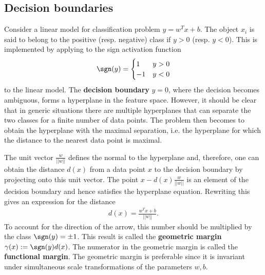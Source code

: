 
\subsection{Decision boundaries}

    Consider a linear model for classification problem $y = w^Tx + b$. The object $x_i$ is said to belong to the positive (resp. negative) class if $y>0$ (resp. $y<0$). This is implemented by applying to the sign activation function
    \begin{gather}
        \sgn(y) =
        \begin{cases}
            1&y>0\\
            -1&y<0
        \end{cases}
    \end{gather}
    to the linear model. The \textbf{decision boundary} $y=0$, where the decision becomes ambiguous, forms a hyperplane in the feature space. However, it should be clear that in generic situations there are multiple hyperplanes that can separate the two classes for a finite number of data points. The problem then becomes to obtain the hyperplane with the maximal separation, i.e. the hyperplane for which the distance to the nearest data point is maximal.

    The unit vector $\frac{w}{||w||}$ defines the normal to the hyperplane and, therefore, one can obtain the distance $d(x)$ from a data point $x$ to the decision boundary by projecting onto this unit vector. The point $x - d(x)\frac{w}{||w||}$ is an element of the decision boundary and hence satisfies the hyperplane equation. Rewriting this gives an expression for the distance
    \begin{gather}
        d(x) = \frac{w^Tx + b}{||w||}.
    \end{gather}
    To account for the direction of the arrow, this number should be multiplied by the class $\sgn(y)=\pm1$. This result is called the \textbf{geometric margin} $\gamma(x):=\sgn(y)d(x)$. The numerator in the geometric margin is called the \textbf{functional margin}. The geometric margin is preferable since it is invariant under simultaneous scale transformations of the parameters $w,b$.

